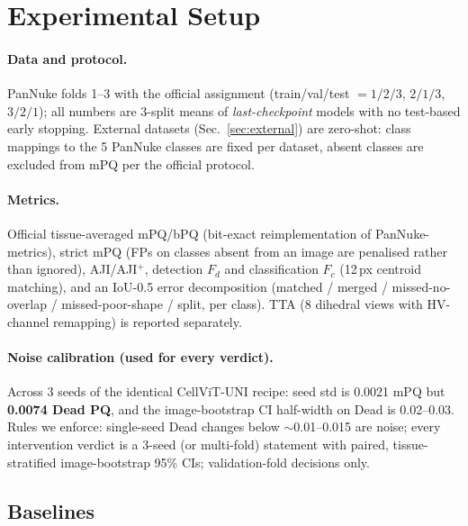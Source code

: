\documentclass[11pt]{article}
\begin{document}
\section{Experimental Setup}
\label{sec:setup}

\paragraph{Data and protocol.} PanNuke folds 1--3 with the official assignment (train/val/test
$=1/2/3$, $2/1/3$, $3/2/1$); all numbers are 3-split means of \emph{last-checkpoint} models with
no test-based early stopping. External datasets (Sec.~\ref{sec:external}) are zero-shot: class
mappings to the 5 PanNuke classes are fixed per dataset, absent classes are excluded from mPQ
per the official protocol.

\paragraph{Metrics.} Official tissue-averaged mPQ/bPQ (bit-exact reimplementation of
PanNuke-metrics), strict mPQ (FPs on classes absent from an image are penalised rather than
ignored), AJI/AJI$^+$, detection $F_d$ and classification $F_c$ (12\,px centroid matching), and
an IoU-0.5 error decomposition (matched / merged / missed-no-overlap / missed-poor-shape /
split, per class). TTA (8 dihedral views with HV-channel remapping) is reported separately.

\paragraph{Noise calibration (used for every verdict).} Across 3 seeds of the identical
CellViT-UNI recipe: seed std is 0.0021 mPQ but \textbf{0.0074 Dead PQ}, and the image-bootstrap
CI half-width on Dead is 0.02--0.03. Rules we enforce: single-seed Dead changes below
$\sim$0.01--0.015 are noise; every intervention verdict is a 3-seed (or multi-fold) statement
with paired, tissue-stratified image-bootstrap 95\% CIs; validation-fold decisions only.

\subsection{Baselines}
\label{sec:baselines}
\end{document}
